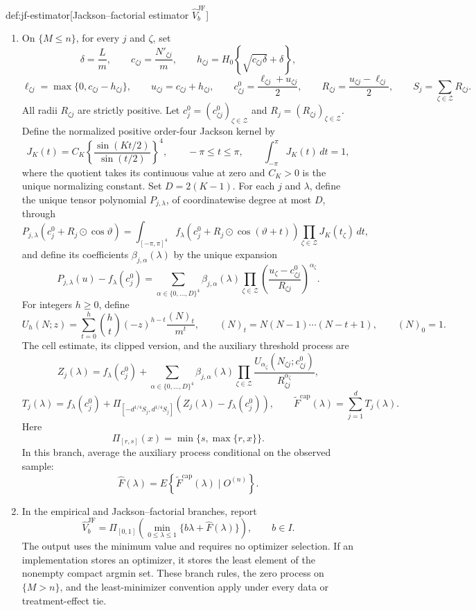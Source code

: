 \begin{algorithmv}{def:jf-estimator}[Jackson–factorial estimator $\widehat V_b^{\mathrm{JF}}$]
\begin{enumerate}
\item On \(\{M\leq n\}\), for every \(j\) and \(\zeta\), set
\[
\delta=\frac Lm,\qquad
c_{\zeta j}=\frac{N'_{\zeta j}}m,\qquad
h_{\zeta j}=H_0\left\{\sqrt{c_{\zeta j}\delta}+\delta\right\},
\]
\[
\ell_{\zeta j}=\max\{0,c_{\zeta j}-h_{\zeta j}\},
\qquad
u_{\zeta j}=c_{\zeta j}+h_{\zeta j},
\qquad
c^0_{\zeta j}=\frac{\ell_{\zeta j}+u_{\zeta j}}2,
\qquad
R_{\zeta j}=\frac{u_{\zeta j}-\ell_{\zeta j}}2,
\qquad
S_j=\sum_{\zeta\in\mathcal Z}R_{\zeta j}.
\]
All radii \(R_{\zeta j}\) are strictly positive. Let \(c_j^0=(c^0_{\zeta j})_{\zeta\in\mathcal Z}\) and \(R_j=(R_{\zeta j})_{\zeta\in\mathcal Z}\). Define the normalized positive order-four Jackson kernel by
\[
J_K(t)=C_K\left\{\frac{\sin(Kt/2)}{\sin(t/2)}\right\}^{4},
\qquad -\pi\leq t\leq\pi,
\qquad
\int_{-\pi}^{\pi}J_K(t)\,dt=1,
\]
where the quotient takes its continuous value at zero and \(C_K>0\) is the unique normalizing constant. Set \(D=2(K-1)\). For each \(j\) and \(\lambda\), define the unique tensor polynomial \(P_{j,\lambda}\), of coordinatewise degree at most \(D\), through
\[
P_{j,\lambda}(c_j^0+R_j\odot\cos\vartheta)
=
\int_{[-\pi,\pi]^4}
f_\lambda\!\left(c_j^0+R_j\odot\cos(\vartheta+t)\right)
\prod_{\zeta\in\mathcal Z}J_K(t_\zeta)\,dt,
\]
and define its coefficients \(\beta_{j,\alpha}(\lambda)\) by the unique expansion
\[
P_{j,\lambda}(u)-f_\lambda(c_j^0)
=
\sum_{\alpha\in\{0,\ldots,D\}^4}
\beta_{j,\alpha}(\lambda)
\prod_{\zeta\in\mathcal Z}
\left(\frac{u_\zeta-c^0_{\zeta j}}{R_{\zeta j}}\right)^{\alpha_\zeta}.
\]
For integers \(h\geq0\), define
\[
U_h(N;z)
=
\sum_{t=0}^h {h\choose t}(-z)^{h-t}\frac{(N)_t}{m^t},
\qquad
(N)_t=N(N-1)\cdots(N-t+1),
\qquad
(N)_0=1.
\]
The cell estimate, its clipped version, and the auxiliary threshold process are
\[
Z_j(\lambda)
=
f_\lambda(c_j^0)+
\sum_{\alpha\in\{0,\ldots,D\}^4}
\beta_{j,\alpha}(\lambda)
\prod_{\zeta\in\mathcal Z}
\frac{U_{\alpha_\zeta}(N_{\zeta j};c^0_{\zeta j})}
{R_{\zeta j}^{\alpha_\zeta}},
\]
\[
T_j(\lambda)
=
f_\lambda(c_j^0)+
\Pi_{[-d^{1/4}S_j,d^{1/4}S_j]}
\!\left(Z_j(\lambda)-f_\lambda(c_j^0)\right),
\qquad
\widetilde F^{\mathrm{cap}}(\lambda)
=
\sum_{j=1}^d T_j(\lambda).
\]
Here
\[
\Pi_{[r,s]}(x)=\min\{s,\max\{r,x\}\}.
\]
In this branch, average the auxiliary process conditional on the observed sample:
\[
\widehat F(\lambda)
=
E\!\left\{\widetilde F^{\mathrm{cap}}(\lambda)\mid O^{(n)}\right\}.
\]

\item In the empirical and Jackson–factorial branches, report
\[
\widehat V_b^{\mathrm{JF}}
=
\Pi_{[0,1]}
\left(
\min_{0\leq\lambda\leq1}
\{b\lambda+\widehat F(\lambda)\}
\right),
\qquad b\in I.
\]
The output uses the minimum value and requires no optimizer selection. If an implementation stores an optimizer, it stores the least element of the nonempty compact argmin set. These branch rules, the zero process on \(\{M>n\}\), and the least-minimizer convention apply under every data or treatment-effect tie.
\end{enumerate}
\end{algorithmv}


